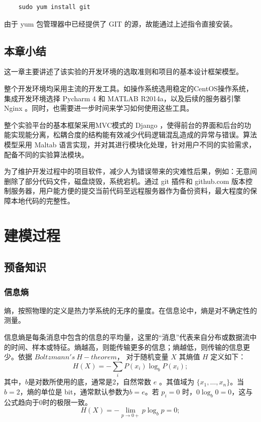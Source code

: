 \documentclass[oneside]{ZJUthesis}
\begin{document}
\begin{verbatim}     
    sudo yum install git
\end{verbatim}
由于 yum 包管理器中已经提供了 GIT 的源，故能通过上述指令直接安装。


\section{本章小结}
这一章主要讲述了该实验的开发环境的选取准则和项目的基本设计框架模型。

整个开发环境均采用主流的开发工具。如操作系统选用稳定的CentOS操作系统，集成开发环境选择 Pycharm 4 和 MATLAB R2014a，以及后续的服务器引擎 Nginx 。同时，也需要进一步时间来学习如何使用这些工具。

整个实验平台的基本框架采用MVC模式的 Django ，使得前台的界面和后台的功能实现能分离，松耦合度的结构能有效减少代码逻辑混乱造成的异常与错误。算法模型采用 Maltab 语言实现，并对其进行模块化处理，针对用户不同的实验需求，配备不同的实验算法模块。

为了维护开发过程中的项目软件，减少人为错误带来的灾难性后果，例如：无意间删除了部分代码文件，磁盘烧毁，系统宕机。通过 git 插件和 github.com 版本控制服务器，用户能方便的提交当前代码至远程服务器作为备份资料，最大程度的保障本地代码的完整性。


\chapter{建模过程}
\section{预备知识}
\subsection{信息熵}
熵，按照物理的定义是热力学系统的无序的量度。在信息论中，熵是对不确定性的测量。

信息熵是每条消息中包含的信息的平均量，这里的``消息''代表来自分布或数据流中的时间、样本或特征。熵越高，则能传输更多的信息；熵越低，则传输的信息更少。依据 $Boltzmann's~H-theorem$， 对于随机变量 $X$ 其熵值 $H$ 定义如下：
\begin{equation}
	H(X)=-\sum\limits_i{P(x_i)\log_b P(x_i)};
\end{equation}
其中，$b$是对数所使用的底，通常是2，自然常数 $e$ 。其值域为 $\{x_1,\dots,x_n\}$。当 $b=2$，熵的单位是 bit，通常默认参数为$b=e$。若 $p_i=0$ 时，$0\log_b 0=0$，这与公式趋向于0时的极限一致。
\begin{equation}
	H(X)=-\lim\limits_{p\to 0+}{p\log_b p=0};
\end{equation}
\end{document}

